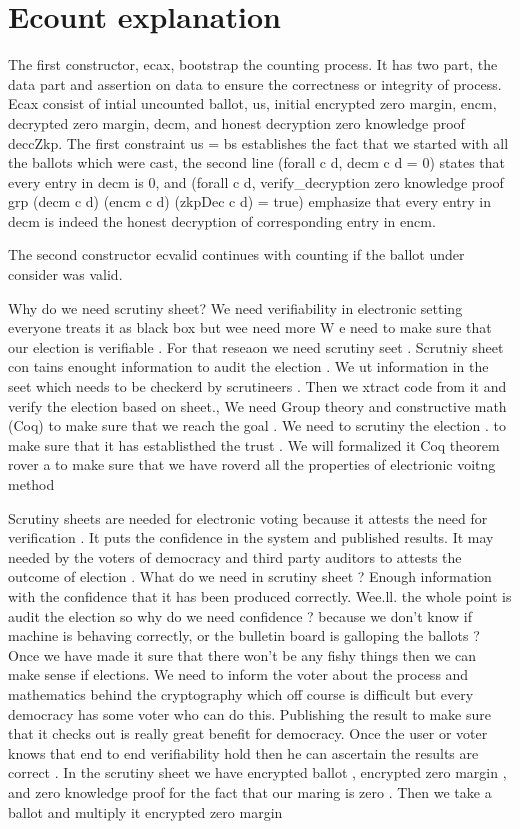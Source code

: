           

\section{Ecount explanation}
The first constructor, ecax, bootstrap the counting process. It has two part, the data part and assertion on data to 
ensure the correctness or integrity of process. Ecax consist of intial uncounted ballot, us, initial encrypted zero margin, 
encm, decrypted zero margin, decm, and honest decryption zero knowledge proof deccZkp. The first constraint us = bs 
establishes the fact that we started with all the ballots which were cast, the second line (forall c d, decm c d = 0) states 
that every entry in decm is 0, and (forall c d, verify_decryption zero knowledge proof grp (decm c d) (encm c d) (zkpDec c d) = true) 
emphasize that every entry in decm is indeed the honest decryption of corresponding entry in encm. 

The second constructor ecvalid continues with counting if the ballot under consider was valid. 








Why do we need scrutiny sheet? We need verifiability in electronic setting everyone treats 
it as black box but wee need more
W e need to make sure that our election is verifiable . For that reseaon we need scrutiny seet . Scrutniy sheet con
tains enought information to audit the election . We ut information in the seet which needs to be checkerd by 
scrutineers . Then we xtract code from it and verify the election based on sheet., 
We need Group theory and constructive math (Coq) to make sure that we reach the goal . We need to scrutiny 
the election . to make sure that it has establisthed the trust . We will formalized it Coq theorem rover a to make 
sure that we have roverd all the properties of electrionic voitng method 

Scrutiny sheets are needed for electronic voting because it attests the need for verification . It puts the confidence 
in the system and published results. It may needed by the voters of democracy and third party auditors to 
attests the outcome of election . What do we need in scrutiny sheet ? Enough information with the confidence
that it has been produced correctly. Wee.ll. the whole point is audit the election so why do we need 
confidence ? because we don't know if machine is behaving correctly, or the bulletin board is galloping
the ballots ? Once we have made it sure that there won't be any fishy things then we can make sense if 
elections. We need to inform the voter about the process and mathematics behind the cryptography 
which off course is difficult but every democracy has some voter who can do this. Publishing the result 
to make sure that it checks out is really great benefit for democracy. Once the user or voter knows that 
end to end verifiability hold then he can ascertain the results are correct . In the scrutiny sheet  
we have encrypted ballot , encrypted zero margin , and zero knowledge proof for the fact that 
our maring is zero . Then we take a ballot and multiply it encrypted zero margin 



